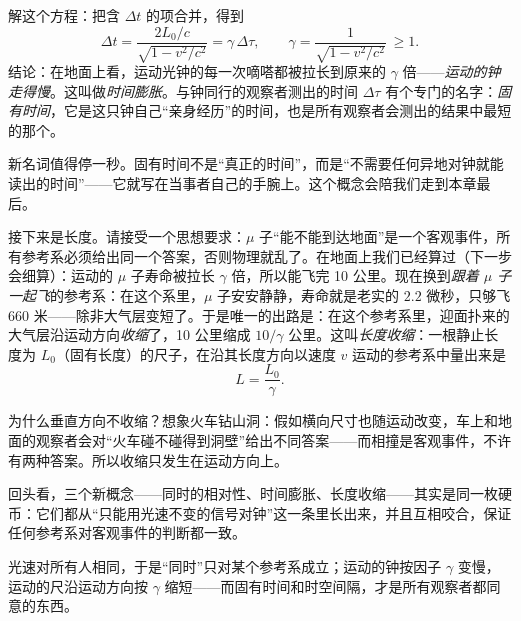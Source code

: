\begin{mainline}
解这个方程：把含 \(\Delta t\) 的项合并，得到
\[
\Delta t=\frac{2L_0/c}{\sqrt{1-v^{2}/c^{2}}}=\gamma\,\Delta\tau,
\qquad
\gamma=\frac{1}{\sqrt{1-v^{2}/c^{2}}}\ \ge 1.
\]
结论：在地面上看，运动光钟的每一次嘀嗒都被拉长到原来的 \(\gamma\) 倍——\emph{运动的钟走得慢}。这叫做\emph{时间膨胀}。与钟同行的观察者测出的时间 \(\Delta\tau\) 有个专门的名字：\emph{固有时间}，它是这只钟自己“亲身经历”的时间，也是所有观察者会测出的结果中最短的那个。

新名词值得停一秒。固有时间不是“真正的时间”，而是“不需要任何异地对钟就能读出的时间”——它就写在当事者自己的手腕上。这个概念会陪我们走到本章最后。

接下来是长度。请接受一个思想要求：\(\mu\) 子“能不能到达地面”是一个客观事件，所有参考系必须给出同一个答案，否则物理就乱了。在地面上我们已经算过（下一步会细算）：运动的 \(\mu\) 子寿命被拉长 \(\gamma\) 倍，所以能飞完 10 公里。现在换到\emph{跟着 \(\mu\) 子一起飞}的参考系：在这个系里，\(\mu\) 子安安静静，寿命就是老实的 \(2.2\) 微秒，只够飞 660 米——除非大气层变短了。于是唯一的出路是：在这个参考系里，迎面扑来的大气层沿运动方向\emph{收缩}了，10 公里缩成 \(10/\gamma\) 公里。这叫\emph{长度收缩}：一根静止长度为 \(L_0\)（固有长度）的尺子，在沿其长度方向以速度 \(v\) 运动的参考系中量出来是
\[
L=\frac{L_0}{\gamma}.
\]

为什么垂直方向不收缩？想象火车钻山洞：假如横向尺寸也随运动改变，车上和地面的观察者会对“火车碰不碰得到洞壁”给出不同答案——而相撞是客观事件，不许有两种答案。所以收缩只发生在运动方向上。

回头看，三个新概念——同时的相对性、时间膨胀、长度收缩——其实是同一枚硬币：它们都从“只能用光速不变的信号对钟”这一条里长出来，并且互相咬合，保证任何参考系对客观事件的判断都一致。
\end{mainline}


\begin{oneline}
光速对所有人相同，于是“同时”只对某个参考系成立；运动的钟按因子 \(\gamma\) 变慢，运动的尺沿运动方向按 \(\gamma\) 缩短——而固有时间和时空间隔，才是所有观察者都同意的东西。
\end{oneline}


